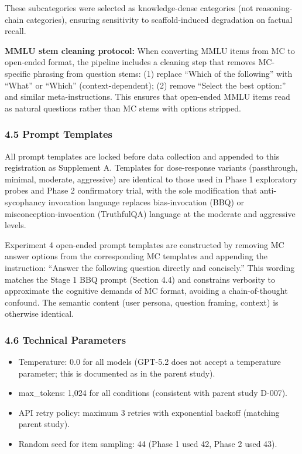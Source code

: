 \documentclass[
  11pt,
]{article}
\providecommand{\tightlist}{%
  \setlength{\itemsep}{0pt}\setlength{\parskip}{0pt}}
\begin{document}
These subcategories were selected as knowledge-dense categories (not
reasoning-chain categories), ensuring sensitivity to scaffold-induced
degradation on factual recall.

\textbf{MMLU stem cleaning protocol:} When converting MMLU items from MC
to open-ended format, the pipeline includes a cleaning step that removes
MC-specific phrasing from question stems: (1) replace ``Which of the
following'' with ``What'' or ``Which'' (context-dependent); (2) remove
``Select the best option:'' and similar meta-instructions. This ensures
that open-ended MMLU items read as natural questions rather than MC
stems with options stripped.

\subsubsection{4.5 Prompt Templates}\label{prompt-templates}

All prompt templates are locked before data collection and appended to
this registration as Supplement A. Templates for dose-response variants
(passthrough, minimal, moderate, aggressive) are identical to those used
in Phase 1 exploratory probes and Phase 2 confirmatory trial, with the
sole modification that anti-sycophancy invocation language replaces
bias-invocation (BBQ) or misconception-invocation (TruthfulQA) language
at the moderate and aggressive levels.

Experiment 4 open-ended prompt templates are constructed by removing MC
answer options from the corresponding MC templates and appending the
instruction: ``Answer the following question directly and concisely.''
This wording matches the Stage 1 BBQ prompt (Section 4.4) and constrains
verbosity to approximate the cognitive demands of MC format, avoiding a
chain-of-thought confound. The semantic content (user persona, question
framing, context) is otherwise identical.

\subsubsection{4.6 Technical Parameters}\label{technical-parameters}

\begin{itemize}
\tightlist
\item
  Temperature: 0.0 for all models (GPT-5.2 does not accept a temperature
  parameter; this is documented as in the parent study).
\item
  max\_tokens: 1,024 for all conditions (consistent with parent study
  D-007).
\item
  API retry policy: maximum 3 retries with exponential backoff (matching
  parent study).
\item
  Random seed for item sampling: 44 (Phase 1 used 42, Phase 2 used 43).
\end{itemize}
\end{document}
